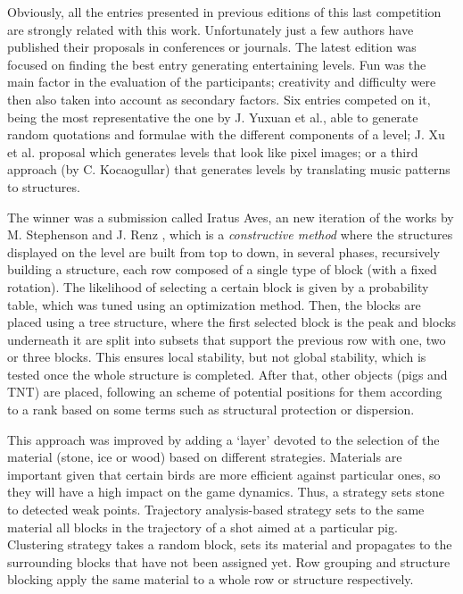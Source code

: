 \documentclass[runningheads,a4paper]{llncs}
\begin{document}
Obviously, all the entries presented in previous editions of this last
competition are strongly related with this
work. Unfortunately just a few  authors have published their
proposals in conferences or journals. The latest edition
\cite{AngryBirds_LevelGeneration_18} was focused on finding the best 
entry generating entertaining levels. Fun was the main factor in the
evaluation of the participants;  creativity and difficulty were then
also taken into account as secondary factors. 
Six entries competed on it, being the most representative the one by
J. Yuxuan et al., able to generate random quotations and formulae with
the different components of a level; J. Xu et al. proposal which
generates levels that look like pixel images; or a third approach (by
C. Kocaogullar) that generates levels by translating music patterns to
structures. %

The winner was a submission called Iratus Aves, an new iteration of
the works by M. Stephenson and J. Renz
\cite{stephenson2017generating,stephenson2016procedural}, which is a
\textit{constructive method} where the structures displayed on the
level are built from top to down, in several phases, recursively
building a structure, each row composed of a single type of block
(with a fixed rotation). The likelihood of selecting a certain block
is given by a probability table, which was tuned using an optimization
method. Then, the blocks are placed using a tree structure, where the
first selected block is the peak and blocks underneath it are split
into subsets that support the previous row with one, two or three
blocks. This ensures local stability, but not global stability, which
is tested once the whole structure is completed.  
After that, other objects (pigs and TNT) are placed, following an
scheme of potential positions for them according to a rank based on
some terms such as structural protection or dispersion. 

This approach was improved by adding a `layer' devoted to the
selection of the material (stone, ice or wood) based on different
strategies. Materials are important given that certain birds are more
efficient against particular ones, so they will have a high impact on
the game dynamics. Thus, a strategy sets stone to detected weak
points. Trajectory analysis-based strategy sets to the same material
all blocks in the trajectory of a shot aimed at a particular
pig. Clustering strategy takes a random block, sets its material and
propagates to the surrounding blocks that have not been assigned
yet. Row grouping and structure blocking apply the same material to a
whole row or structure respectively. 
\end{document}
